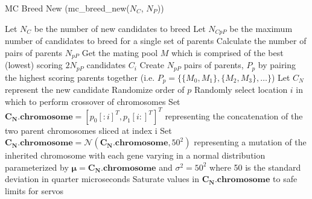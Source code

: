 \documentclass{article}
\begin{document}
\begin{algorithm}
	\caption{MC Breed New (mc\_breed\_new($N_C$, $N_P$))}
	\begin{algorithmic}[1]
		\State Let $N_C$ be the number of new candidates to breed
		\State Let $N_{CpP}$ be the maximum number of candidates to breed for a single set of parents
		\State Calculate the number of pairs of parents $N_{pP}$
		\State Get the mating pool $M$ which is comprised of the best (lowest) scoring $2N_{pP}$ candidates $C_i$
		\State Create $N_{pP}$ pairs of parents, $P_p$ by pairing the highest scoring parents together (i.e. $P_p = \{\{M_0, M_1\}, \{M_2, M_3\}, \dots\}$)
				\State Let $C_N$ represent the new candidate 
				\State Randomize order of $p$
				\State Randomly select location $i$ in which to perform crossover of chromosomes
				\State Set $\mathbf{C_N.chromosome} = [p_0[:i]^T, p_1[i:]^T]^T$ representing the concatenation of the two parent chromosomes sliced at index i
				\State Set $\mathbf{C_N.chromosome} = \mathcal{N}(\mathbf{C_N.chromosome}, 50^2)$ representing a mutation of the inherited chromosome with each gene varying in a normal distribution parameterized by $\mathbf{\mu} = \mathbf{C_N.chromosome}$ and $\sigma^2 = 50^2$ where 50 is the standard deviation in quarter microseconds
				\State Saturate values in $\mathbf{C_N.chromosome}$ to safe limits for servos 
			\EndFor
		\EndFor
	\end{algorithmic} 
\end{algorithm} 
\end{document}
